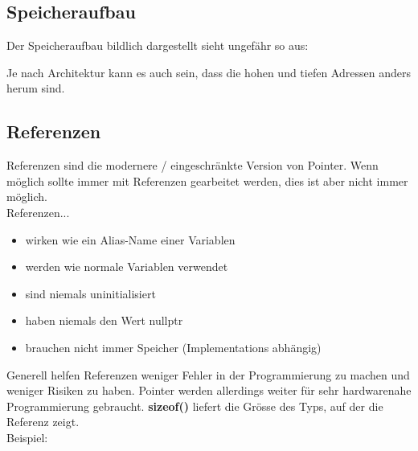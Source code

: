 \nextcol

\subsection{Speicheraufbau}

Der Speicheraufbau bildlich dargestellt sieht ungefähr so aus:

\begin{center}
\end{center}

Je nach Architektur kann es auch sein, dass die hohen und tiefen Adressen anders herum sind.

\subsection{Referenzen}

Referenzen sind die modernere / eingeschränkte Version von Pointer. 
Wenn möglich sollte immer mit Referenzen gearbeitet werden, dies ist aber nicht immer möglich.\\

Referenzen...
\begin{itemize}[itemsep=1pt, parsep=0pt]
    \item wirken wie ein Alias-Name einer Variablen
    \item werden wie normale Variablen verwendet
    \item sind niemals uninitialisiert
    \item haben niemals den Wert nullptr
    \item brauchen nicht immer Speicher (Implementations abhängig)
\end{itemize}

Generell helfen Referenzen weniger Fehler in der Programmierung zu machen und weniger Risiken zu haben. 
Pointer werden allerdings weiter für sehr hardwarenahe Programmierung gebraucht. 
\textbf{sizeof()} liefert die Grösse des Typs, auf der die Referenz zeigt.\\
Beispiel:

